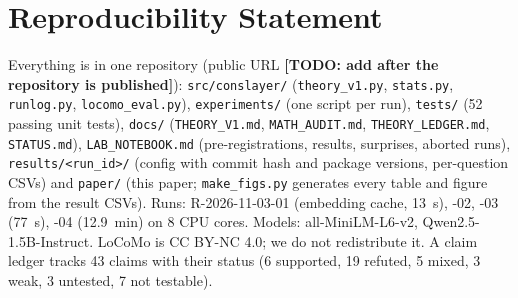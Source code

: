 \documentclass[10pt]{article}
\newcommand{\todo}[1]{\textbf{[TODO: #1]}}
\begin{document}
\section*{Reproducibility Statement}
Everything is in one repository (public URL \todo{add after the repository is published}): \texttt{src/conslayer/} (\texttt{theory\_v1.py}, \texttt{stats.py}, \texttt{runlog.py}, \texttt{locomo\_eval.py}), \texttt{experiments/} (one script per run), \texttt{tests/} (52 passing unit tests), \texttt{docs/} (\texttt{THEORY\_V1.md}, \texttt{MATH\_AUDIT.md}, \texttt{THEORY\_LEDGER.md}, \texttt{STATUS.md}), \texttt{LAB\_NOTEBOOK.md} (pre-registrations, results, surprises, aborted runs), \texttt{results/<run\_id>/} (config with commit hash and package versions, per-question CSVs) and \texttt{paper/} (this paper; \texttt{make\_figs.py} generates every table and figure from the result CSVs). Runs: R-2026-11-03-01 (embedding cache, 13~s), -02, -03 (77~s), -04 (12.9~min) on 8 CPU cores. Models: all-MiniLM-L6-v2, Qwen2.5-1.5B-Instruct. LoCoMo is CC BY-NC 4.0; we do not redistribute it. A claim ledger tracks 43 claims with their status (6 supported, 19 refuted, 5 mixed, 3 weak, 3 untested, 7 not testable).



\end{document}
